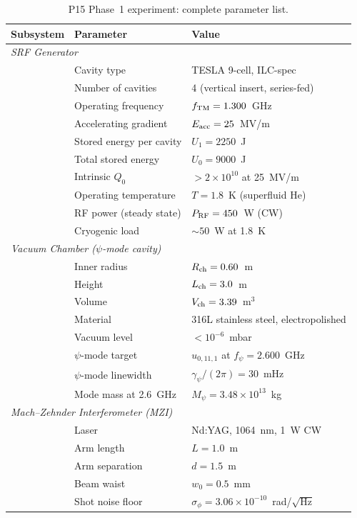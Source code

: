 \documentclass[11pt]{article}
\newcommand{\ee}[1]{\times 10^{#1}}
\newcommand{\gpsi}{\gamma_\psi}
\newcommand{\Mpsi}{M_\psi}
\begin{document}
\begin{table}[H]
\centering
\caption{P15 Phase~1 experiment: complete parameter list.}
\begin{tabular}{lll}
\toprule
\textbf{Subsystem} & \textbf{Parameter} & \textbf{Value} \\
\midrule
\multicolumn{3}{l}{\textit{SRF Generator}} \\
& Cavity type & TESLA 9-cell, ILC-spec \\
& Number of cavities & 4 (vertical insert, series-fed) \\
& Operating frequency & $f_{\rm TM} = 1.300$~GHz \\
& Accelerating gradient & $E_{\rm acc} = 25$~MV/m \\
& Stored energy per cavity & $U_1 = 2250$~J \\
& Total stored energy & $U_0 = 9000$~J \\
& Intrinsic $Q_0$ & $> 2\ee{10}$ at 25~MV/m \\
& Operating temperature & $T = 1.8$~K (superfluid He) \\
& RF power (steady state) & $P_{\rm RF} = 450$~W (CW) \\
& Cryogenic load & $\sim 50$~W at 1.8~K \\
\midrule
\multicolumn{3}{l}{\textit{Vacuum Chamber ($\psi$-mode cavity)}} \\
& Inner radius & $R_{\rm ch} = 0.60$~m \\
& Height & $L_{\rm ch} = 3.0$~m \\
& Volume & $V_{\rm ch} = 3.39$~m$^3$ \\
& Material & 316L stainless steel, electropolished \\
& Vacuum level & $< 10^{-6}$~mbar \\
& $\psi$-mode target & $u_{0,11,1}$ at $f_\psi = 2.600$~GHz \\
& $\psi$-mode linewidth & $\gpsi/(2\pi) = 30$~mHz \\
& Mode mass at 2.6~GHz & $\Mpsi = 3.48\ee{13}$~kg \\
\midrule
\multicolumn{3}{l}{\textit{Mach--Zehnder Interferometer (MZI)}} \\
& Laser & Nd:YAG, 1064~nm, 1~W CW \\
& Arm length & $L = 1.0$~m \\
& Arm separation & $d = 1.5$~m \\
& Beam waist & $w_0 = 0.5$~mm \\
& Shot noise floor & $\sigma_\phi = 3.06\ee{-10}$~rad/$\sqrt{\text{Hz}}$ \\

\end{tabular}
\end{table}
\end{document}
